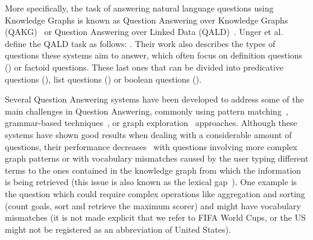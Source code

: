 More specifically, the task of answering natural language questions using Knowledge Graphs 
is known as Question Answering over Knowledge Graphs (QAKG)~\cite{qa:nn-qakg-Chakraborty19} or Question 
Answering over Linked Data (QALD)~\cite{qa:intro-UngerFC14, qa:qald-Lopezetal2013}. Unger et 
al.~\cite{qa:intro-UngerFC14} define the QALD task as follows: . Their work also describes the types of questions these systems 
aim to answer, which often focus on definition questions () or factoid 
questions. These last ones that can be divided into predicative questions (), list questions () or boolean questions 
(). 

Several Question Answering systems have been developed to address some of the main 
challenges in Question Answering, commonly using pattern matching~\cite{qa:pattern-FaderZE13, 
qa:pattern-LopezFMS12}, grammar-based techniques~\cite{qa:grammar-DamljanovicAC10, 
qa:grammar-2-Marginean17}, or graph exploration~\cite{qa:graph-XuFZ14, qa:graph-2-ZouHWYHZ14} 
approaches. Although these systems have shown good results when dealing with a considerable amount of 
questions, their performance decreases~\cite{qa:challenges-semweb-HoffnerWMULN17} with questions 
involving more complex graph patterns or with vocabulary mismatches caused by the user typing 
different terms to the ones contained in the knowledge graph from which the information is being 
retrieved (this issue is also known as the lexical gap~\cite{semPar:lexical-gap-HakimovUWC15}). One 
example is the question  which could 
require complex operations like aggregation and sorting (count goals, sort and retrieve the maximum 
scorer) and might have vocabulary mismatches (it is not made explicit that we refer to FIFA World 
Cups, or the US might not be registered as an abbreviation of United States).

